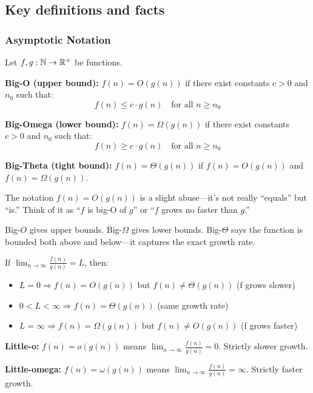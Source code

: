 \subsection*{Key definitions and facts}

\subsubsection*{Asymptotic Notation}

\begin{definition}
Let $f, g: \mathbb{N} \to \mathbb{R}^+$ be functions.

\textbf{Big-O (upper bound):} $f(n) = O(g(n))$ if there exist constants $c > 0$ and $n_0$ such that:
\[
f(n) \leq c \cdot g(n) \quad \text{for all } n \geq n_0
\]

\textbf{Big-Omega (lower bound):} $f(n) = \Omega(g(n))$ if there exist constants $c > 0$ and $n_0$ such that:
\[
f(n) \geq c \cdot g(n) \quad \text{for all } n \geq n_0
\]

\textbf{Big-Theta (tight bound):} $f(n) = \Theta(g(n))$ if $f(n) = O(g(n))$ and $f(n) = \Omega(g(n))$.
\end{definition}

The notation $f(n) = O(g(n))$ is a slight abuse---it's not really ``equals'' but ``is.'' Think of it as ``$f$ is big-O of $g$'' or ``$f$ grows no faster than $g$.''

Big-$O$ gives upper bounds. Big-$\Omega$ gives lower bounds. Big-$\Theta$ says the function is bounded both above and below---it captures the exact growth rate.

\begin{theorem}
If $\lim_{n \to \infty} \frac{f(n)}{g(n)} = L$, then:
\begin{itemize}
  \item $L = 0 \Rightarrow f(n) = O(g(n))$ but $f(n) \neq \Theta(g(n))$ (f grows slower)
  \item $0 < L < \infty \Rightarrow f(n) = \Theta(g(n))$ (same growth rate)
  \item $L = \infty \Rightarrow f(n) = \Omega(g(n))$ but $f(n) \neq O(g(n))$ (f grows faster)
\end{itemize}
\end{theorem}

\begin{definition}
\textbf{Little-o:} $f(n) = o(g(n))$ means $\lim_{n \to \infty} \frac{f(n)}{g(n)} = 0$. Strictly slower growth.

\textbf{Little-omega:} $f(n) = \omega(g(n))$ means $\lim_{n \to \infty} \frac{f(n)}{g(n)} = \infty$. Strictly faster growth.
\end{definition}

